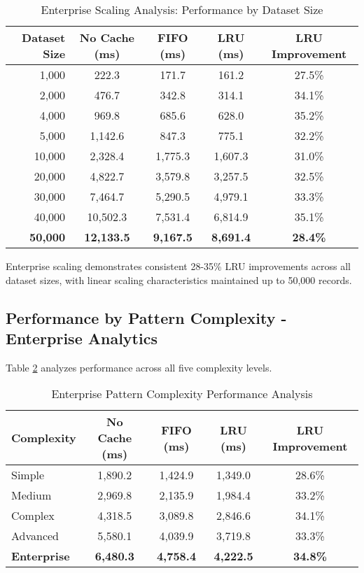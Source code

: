 \documentclass[conference]{IEEEtran}
\begin{document}
\begin{table}[H]
\centering
\caption{Enterprise Scaling Analysis: Performance by Dataset Size}
\label{tab:enterprise_scaling}
\begin{tabular}{@{}rcccc@{}}
\toprule
\textbf{Dataset Size} & \textbf{No Cache (ms)} & \textbf{FIFO (ms)} & \textbf{LRU (ms)} & \textbf{LRU Improvement} \\
\midrule
1,000 & 222.3 & 171.7 & 161.2 & 27.5\% \\
2,000 & 476.7 & 342.8 & 314.1 & 34.1\% \\
4,000 & 969.8 & 685.6 & 628.0 & 35.2\% \\
5,000 & 1,142.6 & 847.3 & 775.1 & 32.2\% \\
10,000 & 2,328.4 & 1,775.3 & 1,607.3 & 31.0\% \\
20,000 & 4,822.7 & 3,579.8 & 3,257.5 & 32.5\% \\
30,000 & 7,464.7 & 5,290.5 & 4,979.1 & 33.3\% \\
40,000 & 10,502.3 & 7,531.4 & 6,814.9 & 35.1\% \\
\textbf{50,000} & \textbf{12,133.5} & \textbf{9,167.5} & \textbf{8,691.4} & \textbf{28.4\%} \\
\bottomrule
\end{tabular}
\end{table}

Enterprise scaling demonstrates consistent 28-35\% LRU improvements across all dataset sizes, with linear scaling characteristics maintained up to 50,000 records.

\subsection{Performance by Pattern Complexity - Enterprise Analytics}

Table \ref{tab:enterprise_complexity} analyzes performance across all five complexity levels.

\begin{table}[H]
\centering
\caption{Enterprise Pattern Complexity Performance Analysis}
\label{tab:enterprise_complexity}
\begin{tabular}{@{}lcccc@{}}
\toprule
\textbf{Complexity} & \textbf{No Cache (ms)} & \textbf{FIFO (ms)} & \textbf{LRU (ms)} & \textbf{LRU Improvement} \\
\midrule
Simple & 1,890.2 & 1,424.9 & 1,349.0 & 28.6\% \\
Medium & 2,969.8 & 2,135.9 & 1,984.4 & 33.2\% \\
Complex & 4,318.5 & 3,089.8 & 2,846.6 & 34.1\% \\
Advanced & 5,580.1 & 4,039.9 & 3,719.8 & 33.3\% \\
\textbf{Enterprise} & \textbf{6,480.3} & \textbf{4,758.4} & \textbf{4,222.5} & \textbf{34.8\%} \\
\bottomrule
\end{tabular}
\end{table}
\end{document}
